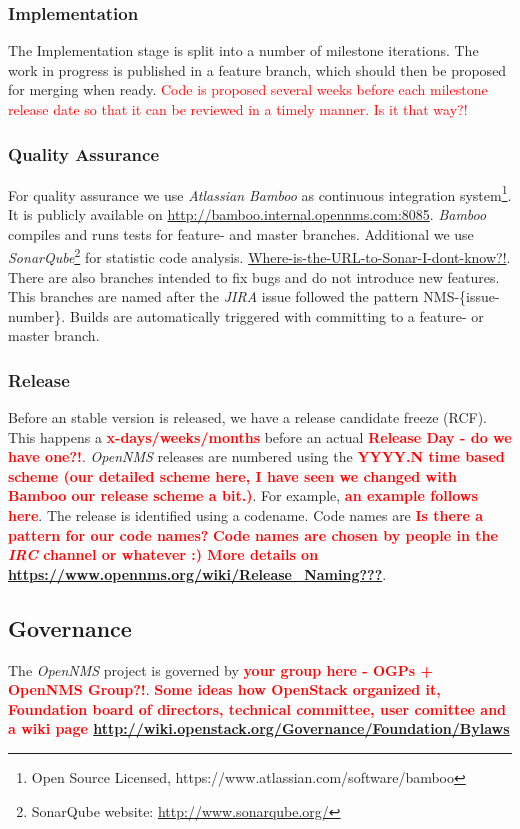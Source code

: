 \subsubsection{Implementation}
The Implementation stage is split into a number of milestone iterations. The work in progress is published in a feature branch, which should then be proposed for merging when ready. \textcolor{red}{Code is proposed several weeks before each milestone release date so that it can be reviewed in a timely manner. Is it that way?!}

\subsubsection{Quality Assurance}
For quality assurance we use \emph{Atlassian Bamboo} as continuous integration system\footnote{Open Source Licensed, https://www.atlassian.com/software/bamboo}. It is publicly available on \url{http://bamboo.internal.opennms.com:8085}. \emph{Bamboo} compiles and runs tests for feature- and master branches. Additional we use \emph{SonarQube}\footnote{SonarQube website: \url{http://www.sonarqube.org/}} for statistic code analysis. \textcolor{red}{\url{Where-is-the-URL-to-Sonar-I-dont-know?!}}. There are also branches intended to fix bugs and do not introduce new features. This branches are named after the \emph{JIRA} issue followed the pattern NMS-\{issue-number\}. Builds are automatically triggered with committing to a feature- or master branch.

\subsubsection{Release}
Before an stable version is released, we have a release candidate freeze (RCF). This happens a \textbf{\textcolor{red}{x-days/weeks/months}} before an actual \textbf{\textcolor{red}{Release Day - do we have one?!}}. \emph{OpenNMS} releases are numbered using the \textbf{\textcolor{red}{YYYY.N time based scheme (our detailed scheme here, I have seen we changed with Bamboo our release scheme a bit.)}}. For example, \textbf{\textcolor{red}{an example follows here}}. The release is identified using a codename. Code names are \textbf{\textcolor{red}{Is there a pattern for our code names?}} \textbf{\textcolor{red}{Code names are chosen by people in the \emph{IRC} channel or whatever :) More details on \url{https://www.opennms.org/wiki/Release_Naming???}}}.

\subsection{Governance}
The \emph{OpenNMS} project is governed by \textbf{\textcolor{red}{your group here - OGPs + OpenNMS Group?!}}. \textbf{\textcolor{red}{Some ideas how OpenStack organized it, Foundation board of directors, technical committee, user comittee and a wiki page \url{http://wiki.openstack.org/Governance/Foundation/Bylaws}}}
